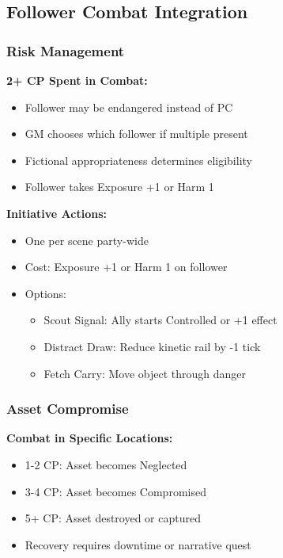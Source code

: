 \documentclass[11pt,letterpaper]{article}
\begin{document}
\subsection{Follower Combat Integration}

\subsubsection{Risk Management}

\textbf{2+ CP Spent in Combat:}
\begin{itemize}[leftmargin=*]
    \item Follower may be endangered instead of PC
    \item GM chooses which follower if multiple present
    \item Fictional appropriateness determines eligibility
    \item Follower takes Exposure +1 or Harm 1
\end{itemize}

\textbf{Initiative Actions:}
\begin{itemize}[leftmargin=*]
    \item One per scene party-wide
    \item Cost: Exposure +1 or Harm 1 on follower
    \item Options:
    \begin{itemize}
        \item Scout Signal: Ally starts Controlled or +1 effect
        \item Distract Draw: Reduce kinetic rail by -1 tick
        \item Fetch Carry: Move object through danger
    \end{itemize}
\end{itemize}

\subsubsection{Asset Compromise}

\textbf{Combat in Specific Locations:}
\begin{itemize}[leftmargin=*]
    \item 1-2 CP: Asset becomes Neglected
    \item 3-4 CP: Asset becomes Compromised
    \item 5+ CP: Asset destroyed or captured
    \item Recovery requires downtime or narrative quest
\end{itemize}
\end{document}

